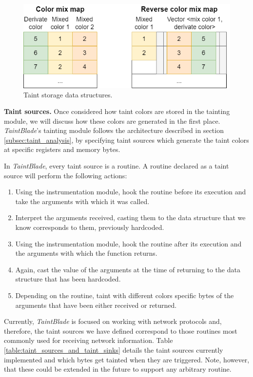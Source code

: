 \documentclass[conference]{IEEEtran}
\begin{document}
\begin{figure}
    \centerline{\includegraphics[width=0.9\columnwidth]{images/colormixtaintarch.drawio.png}}
    \caption{Taint storage data structures.}
    \label{figure:colormixtaintarch}
\end{figure}

\textbf{Taint sources.} Once considered how taint colors are stored in the tainting
module, we will discuss how these colors are generated in the first place. \textit{TaintBlade}'s
tainting module follows the architecture described in section \ref{subsec:taint_analysis}, by specifying taint sources
which generate the taint colors at specific registers and memory bytes.

In \textit{TaintBlade}, every taint source is a routine. A routine declared as
a taint source will perform the following actions:
\begin{enumerate}
    \item Using the instrumentation module, hook the routine before its execution and
          take the arguments with which it was called.
    \item Interpret the arguments received, casting them to the data structure that we
          know corresponds to them, previously hardcoded.
    \item Using the instrumentation module, hook the routine after its execution and the
          arguments with which the function returns.
    \item Again, cast the value of the arguments at the time of returning to the data
          structure that has been hardcoded.
    \item Depending on the routine, taint with different colors specific bytes of the
          arguments that have been either received or returned.
\end{enumerate}

Currently, \textit{TaintBlade} is focused on working with network protocols
and, therefore, the taint sources we have defined correspond to those routines
most commonly used for receiving network information. Table
\ref{table:taint_sources_and_taint_sinks} details the taint sources currently
implemented and which bytes get tainted when they are triggered. Note, however,
that these could be extended in the future to support any arbitrary routine.
\end{document}
